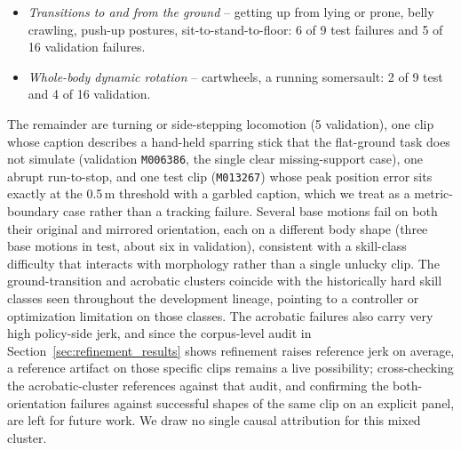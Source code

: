 \begin{itemize}
\item \emph{Transitions to and from the ground} -- getting up from lying or
prone, belly crawling, push-up postures, sit-to-stand-to-floor: 6 of 9 test
failures and 5 of 16 validation failures.
\item \emph{Whole-body dynamic rotation} -- cartwheels, a running
somersault: 2 of 9 test and 4 of 16 validation.
\end{itemize}

The remainder are turning or side-stepping locomotion (5 validation), one
clip whose caption describes a hand-held sparring stick that the flat-ground
task does not simulate (validation \texttt{M006386}, the single clear
missing-support case), one abrupt run-to-stop, and one test clip
(\texttt{M013267}) whose peak position error sits exactly at the 0.5\,m
threshold with a garbled caption, which we treat as a metric-boundary case
rather than a tracking failure. Several base motions fail on both their
original and mirrored orientation, each on a different body shape (three
base motions in test, about six in validation), consistent with a
skill-class difficulty that interacts with morphology rather than a single
unlucky clip. The ground-transition and acrobatic clusters coincide with the
historically hard skill classes seen throughout the development lineage,
pointing to a controller or optimization limitation on those classes. The
acrobatic failures also carry very high policy-side jerk, and since the
corpus-level audit in Section~\ref{sec:refinement_results} shows refinement
raises reference jerk on average, a reference artifact on those specific
clips remains a live possibility; cross-checking the acrobatic-cluster
references against that audit, and confirming the both-orientation failures
against successful shapes of the same clip on an explicit panel, are left for
future work. We draw no single causal attribution for this mixed cluster.
